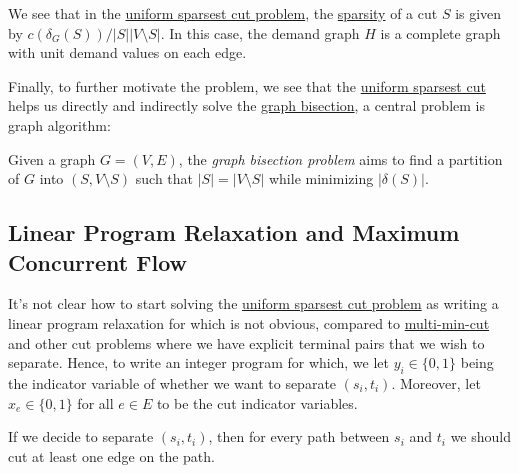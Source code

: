 We see that in the \hyperref[prb:sparsest-cut]{uniform sparsest cut problem}, the \hyperref[def:sparsity]{sparsity} of a cut \(S\) is given by \(c(\delta _G(S)) / \lvert S \rvert \lvert V \setminus S \rvert \). In this case, the demand graph \(H\) is a complete graph with unit demand values on each edge.

Finally, to further motivate the problem, we see that the \hyperref[prb:sparsest-cut]{uniform sparsest cut} helps us directly and indirectly solve the \hyperref[prb:graph-bisection]{graph bisection}, a central problem is graph algorithm:

\begin{problem}\label{prb:graph-bisection}
Given a graph \(G = (V, E)\), the \emph{graph bisection problem} aims to find a partition of \(G\) into \((S, V \setminus S)\) such that \(\lvert S \rvert = \lvert V \setminus S \rvert \) while minimizing \(\lvert \delta (S) \rvert \).
\end{problem}

\subsection{Linear Program Relaxation and Maximum Concurrent Flow}
It's not clear how to start solving the \hyperref[prb:sparsest-cut]{uniform sparsest cut problem} as writing a linear program relaxation for which is not obvious, compared to \hyperref[prb:multi-min-cut]{multi-min-cut} and other cut problems where we have explicit terminal pairs that we wish to separate. Hence, to write an integer program for which, we let \(y_i \in \{ 0, 1 \} \) being the indicator variable of whether we want to separate \((s_i, t_i)\). Moreover, let \(x_e \in \{ 0, 1 \} \) for all \(e \in E\) to be the cut indicator variables.

\begin{intuition}
	If we decide to separate \((s_i, t_i)\), then for every path between \(s_i\) and \(t_i\) we should cut at least one edge on the path.
\end{intuition}

